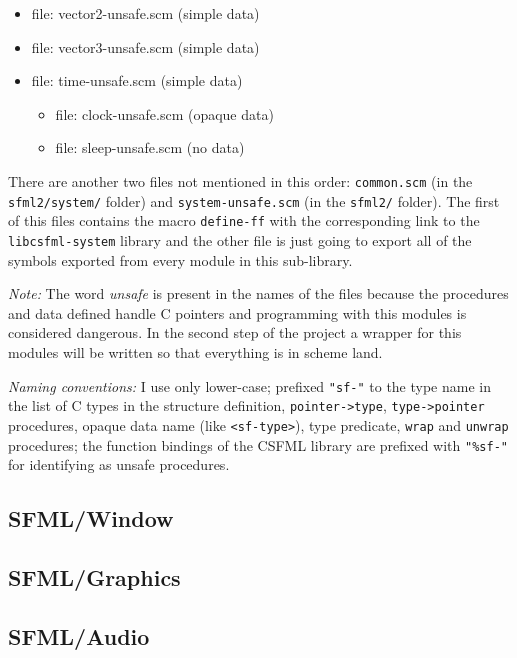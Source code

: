\documentclass[latterpaper, leqno]{article}
\begin{document}
\begin{itemize}
  \item file: vector2-unsafe.scm (simple data)
  \item file: vector3-unsafe.scm (simple data)
  \item file: time-unsafe.scm (simple data)
    \begin{itemize}
      \item file: clock-unsafe.scm (opaque data)
      \item file: sleep-unsafe.scm (no data)
    \end{itemize}
\end{itemize}

There are another two files not mentioned in this order: \texttt{common.scm} (in the \texttt{sfml2/system/} folder) and \texttt{system-unsafe.scm} (in the \texttt{sfml2/} folder). The first of this files contains the macro \texttt{define-ff} with the corresponding link to the \texttt{libcsfml-system} library and the other file is just going to export all of the symbols exported from every module in this sub-library.

\bigskip

\emph{Note:} The word \emph{unsafe} is present in the names of the files because the procedures and data defined handle C pointers and programming with this modules is considered dangerous. In the second step of the project a wrapper for this modules will be written so that everything is in scheme land.

\bigskip

\emph{Naming conventions:} I use only lower-case; prefixed \texttt{"sf-"} to the type name in the list of C types in the structure definition, \texttt{pointer->type}, \texttt{type->pointer} procedures, opaque data name (like \texttt{<sf-type>}), type predicate, \texttt{wrap} and \texttt{unwrap} procedures; the function bindings of the CSFML library are prefixed with \texttt{"\%sf-"} for identifying as unsafe procedures.


\subsection{SFML/Window}
\subsection{SFML/Graphics}
\subsection{SFML/Audio}
\end{document}
